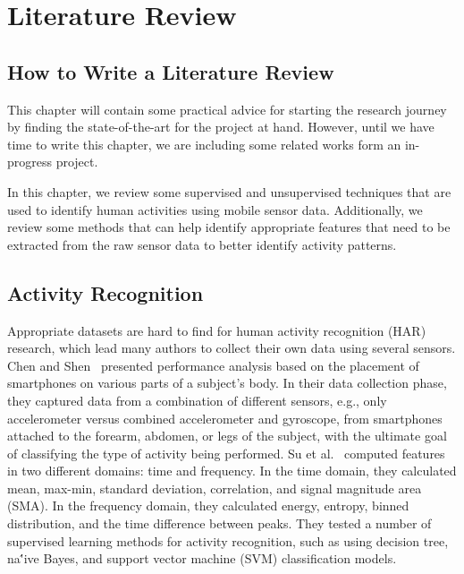 \section{Literature Review}\label{sec:literature_review}

\subsection{How to Write a Literature Review}\label{sec:literature_review:howto}

This chapter will contain some practical advice for starting the research journey by finding the state-of-the-art for the project at hand. However, until we have time to write this chapter, we are including some related works form an in-progress project.

In this chapter, we review some supervised and unsupervised techniques that are used to identify human activities using mobile sensor data. Additionally, we review some methods that can help identify appropriate features that need to be extracted from the raw sensor data to better identify activity patterns.

\subsection{Activity Recognition}
Appropriate datasets are hard to find for human activity recognition (HAR) research, which lead many authors to collect their own data using several sensors. Chen and Shen~\cite{chen2017} presented performance analysis based on the placement of smartphones on various parts of a subject's body. In their data collection phase, they captured data from a combination of different sensors, e.g., only accelerometer versus combined accelerometer and gyroscope, from smartphones attached to the forearm, abdomen, or legs of the subject, with the ultimate goal of classifying the type of activity being performed.
Su et al.~\cite{su2014} computed features in two different domains: time and frequency. In the time domain, they calculated mean, max-min, standard deviation, correlation, and signal magnitude area (SMA). In the frequency domain, they calculated energy, entropy, binned distribution, and the time difference between peaks. They tested a number of supervised learning methods for activity recognition, such as using decision tree, na\''{i}ve Bayes, and support vector machine (SVM) classification models. 

